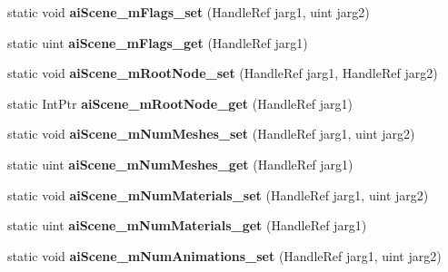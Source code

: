 \begin{DoxyCompactItemize}
\item 
\hypertarget{class_assimp_p_i_n_v_o_k_e_a78ac786f5ff40a5c5f066f948b92c5c4}{static void {\bfseries ai\+Scene\+\_\+m\+Flags\+\_\+set} (Handle\+Ref jarg1, uint jarg2)}\label{class_assimp_p_i_n_v_o_k_e_a78ac786f5ff40a5c5f066f948b92c5c4}

\item 
\hypertarget{class_assimp_p_i_n_v_o_k_e_ac3581faec532fd7f4158138fee197923}{static uint {\bfseries ai\+Scene\+\_\+m\+Flags\+\_\+get} (Handle\+Ref jarg1)}\label{class_assimp_p_i_n_v_o_k_e_ac3581faec532fd7f4158138fee197923}

\item 
\hypertarget{class_assimp_p_i_n_v_o_k_e_a2e8e264e5f55a5cf5ba8bc1074f8ea8e}{static void {\bfseries ai\+Scene\+\_\+m\+Root\+Node\+\_\+set} (Handle\+Ref jarg1, Handle\+Ref jarg2)}\label{class_assimp_p_i_n_v_o_k_e_a2e8e264e5f55a5cf5ba8bc1074f8ea8e}

\item 
\hypertarget{class_assimp_p_i_n_v_o_k_e_a942db9083bdc3b1531c51de9978f20aa}{static Int\+Ptr {\bfseries ai\+Scene\+\_\+m\+Root\+Node\+\_\+get} (Handle\+Ref jarg1)}\label{class_assimp_p_i_n_v_o_k_e_a942db9083bdc3b1531c51de9978f20aa}

\item 
\hypertarget{class_assimp_p_i_n_v_o_k_e_a4d4faec1f9a5ab73d46d18f75c494afb}{static void {\bfseries ai\+Scene\+\_\+m\+Num\+Meshes\+\_\+set} (Handle\+Ref jarg1, uint jarg2)}\label{class_assimp_p_i_n_v_o_k_e_a4d4faec1f9a5ab73d46d18f75c494afb}

\item 
\hypertarget{class_assimp_p_i_n_v_o_k_e_a5b1feac7a5c34ca0e4d009d08f13ab25}{static uint {\bfseries ai\+Scene\+\_\+m\+Num\+Meshes\+\_\+get} (Handle\+Ref jarg1)}\label{class_assimp_p_i_n_v_o_k_e_a5b1feac7a5c34ca0e4d009d08f13ab25}

\item 
\hypertarget{class_assimp_p_i_n_v_o_k_e_a831f584615f00d55acbcd15059cfd585}{static void {\bfseries ai\+Scene\+\_\+m\+Num\+Materials\+\_\+set} (Handle\+Ref jarg1, uint jarg2)}\label{class_assimp_p_i_n_v_o_k_e_a831f584615f00d55acbcd15059cfd585}

\item 
\hypertarget{class_assimp_p_i_n_v_o_k_e_a4c76579b301fe85466b2f73313c90c89}{static uint {\bfseries ai\+Scene\+\_\+m\+Num\+Materials\+\_\+get} (Handle\+Ref jarg1)}\label{class_assimp_p_i_n_v_o_k_e_a4c76579b301fe85466b2f73313c90c89}

\item 
\hypertarget{class_assimp_p_i_n_v_o_k_e_a5792673256c0be6dc2e4b1ece3ded2a5}{static void {\bfseries ai\+Scene\+\_\+m\+Num\+Animations\+\_\+set} (Handle\+Ref jarg1, uint jarg2)}\label{class_assimp_p_i_n_v_o_k_e_a5792673256c0be6dc2e4b1ece3ded2a5}


\end{DoxyCompactItemize}
